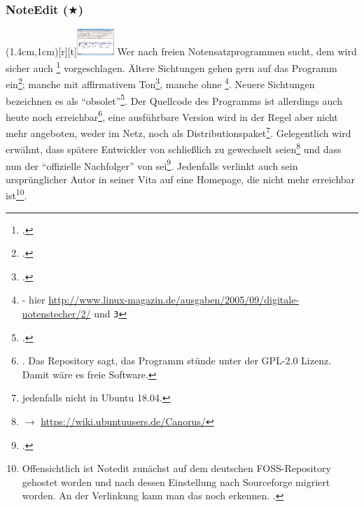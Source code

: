 %
%
%



\subsubsection{NoteEdit ($\bigstar$)}

\parpic(1.4cm,1cm)[r][t]{\includegraphics[width=1.4cm]{logos/noteedit-300dpi.png}}
\label{NoteEdit}Wer nach freien Notensatzprogrammen sucht, dem wird sicher auch
\footcite[vgl.][\nopage wp]{Andres2002a} vorgeschlagen. Ältere
Sichtungen gehen gern auf das Programm ein\footcite[vgl.][\nopage
wp]{Roitman2007a}; manche mit affirmativem Ton\footcite[vgl.][\nopage
wp]{LinuxSoundNotation2006a}, manche ohne
\footnote{\cite[vgl.][\nopage]{Brendel2005a} - hier
\href{http://www.linux-magazin.de/ausgaben/2005/09/digitale-notenstecher/2/}
{http://www.linux-magazin.de/ausgaben/2005/09/digitale-notenstecher/2/} und
\texttt{\/3\/}}. Neuere Sichtungen bezeichnen es als
\enquote{obsolet}\footcite[vgl.][\nopage wp]{WpedNotensatz2019a}.
Der Quellcode des Programms ist allerdings auch heute noch
erreichbar\footnote{\cite[vgl.][\nopage]{NoteeditRep2014a}. Das Repository sagt,
das Programm stünde unter der GPL-2.0 Lizenz. Damit wäre es freie Software.},
eine ausführbare Version wird in der Regel aber nicht mehr angeboten, weder im
Netz, noch als Distri\-bu\-tions\-paket\footnote{jedenfalls nicht in Ubuntu
18.04.}. Gelegentlich wird erwähnt, dass spätere Entwickler von 
schließlich zu  gewechselt seien\footnote{$\rightarrow$
\href{https://wiki.ubuntuusers.de/Canorus/}{https://wiki.ubuntuusers.de/Canorus/}
} und dass  nun der \enquote{offizielle Nachfolger} von
 sei\footcite[vgl.][\nopage wp]{WpedCanorus2019a}.
Jedenfalls verlinkt auch sein ursprünglicher Autor  in seiner Vita
auf eine Homepage, die nicht mehr erreichbar ist\footnote{Offensichtlich ist
Notedit zunächst auf dem deutschen FOSS-Repository  gehostet worden
und nach dessen Einstellung nach Sourceforge migriert worden. An der Verlinkung
kann man das noch erkennen. \cite[vgl. dazu][\nopage wp]{Andres2018a}.}.

